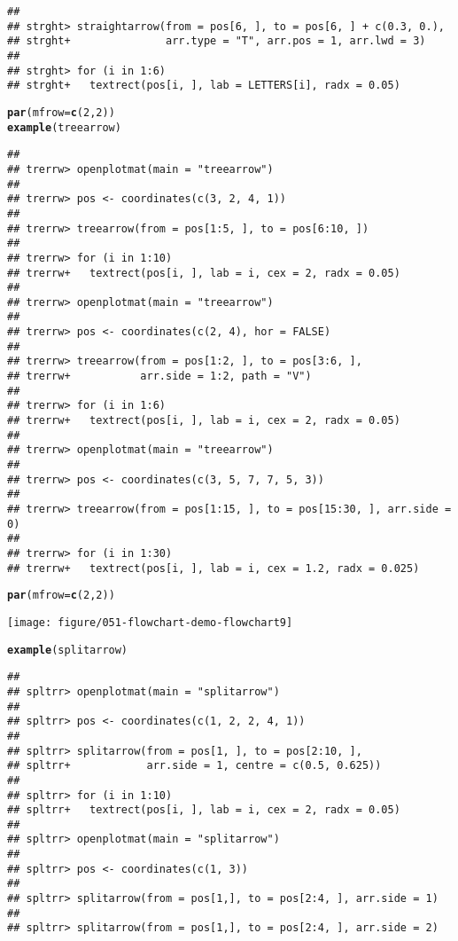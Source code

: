 \documentclass{article}\usepackage[]{graphicx}\usepackage[]{color}
\makeatletter
\def\maxwidth{ %
  \ifdim\Gin@nat@width>\linewidth
    \linewidth
  \else
    \Gin@nat@width
  \fi
}
\newcommand{\hlnum}[1]{\textcolor[rgb]{0.686,0.059,0.569}{#1}}%
\newcommand{\hlstd}[1]{\textcolor[rgb]{0.345,0.345,0.345}{#1}}%
\newcommand{\hlkwc}[1]{\textcolor[rgb]{0.333,0.667,0.333}{#1}}%
\newcommand{\hlkwd}[1]{\textcolor[rgb]{0.737,0.353,0.396}{\textbf{#1}}}%
\newenvironment{kframe}{%
 \def\at@end@of@kframe{}%
 \ifinner\ifhmode%
  \def\at@end@of@kframe{\end{minipage}}%
  \begin{minipage}{\columnwidth}%
 \fi\fi%
 \def\FrameCommand##1{\hskip\@totalleftmargin \hskip-\fboxsep
 \colorbox{shadecolor}{##1}\hskip-\fboxsep
     \hskip-\linewidth \hskip-\@totalleftmargin \hskip\columnwidth}%
 \MakeFramed {\advance\hsize-\width
   \@totalleftmargin\z@ \linewidth\hsize
   \@setminipage}}%
 {\par\unskip\endMakeFramed%
 \at@end@of@kframe}
\newenvironment{knitrout}{}{} %
\makeatother
\begin{document}
\begin{knitrout}
\begin{kframe}
\begin{verbatim}
## 
## strght> straightarrow(from = pos[6, ], to = pos[6, ] + c(0.3, 0.), 
## strght+               arr.type = "T", arr.pos = 1, arr.lwd = 3)    
## 
## strght> for (i in 1:6) 
## strght+   textrect(pos[i, ], lab = LETTERS[i], radx = 0.05)
\end{verbatim}
\begin{alltt}
\hlkwd{par}\hlstd{(}\hlkwc{mfrow} \hlstd{=} \hlkwd{c}\hlstd{(}\hlnum{2}\hlstd{,} \hlnum{2}\hlstd{))}
\hlkwd{example}\hlstd{(treearrow)}
\end{alltt}
\begin{verbatim}
## 
## trerrw> openplotmat(main = "treearrow")
## 
## trerrw> pos <- coordinates(c(3, 2, 4, 1))
## 
## trerrw> treearrow(from = pos[1:5, ], to = pos[6:10, ])
## 
## trerrw> for (i in 1:10) 
## trerrw+   textrect(pos[i, ], lab = i, cex = 2, radx = 0.05)
## 
## trerrw> openplotmat(main = "treearrow")
## 
## trerrw> pos <- coordinates(c(2, 4), hor = FALSE)
## 
## trerrw> treearrow(from = pos[1:2, ], to = pos[3:6, ], 
## trerrw+           arr.side = 1:2, path = "V")
## 
## trerrw> for (i in 1:6) 
## trerrw+   textrect(pos[i, ], lab = i, cex = 2, radx = 0.05)
## 
## trerrw> openplotmat(main = "treearrow")
## 
## trerrw> pos <- coordinates(c(3, 5, 7, 7, 5, 3))
## 
## trerrw> treearrow(from = pos[1:15, ], to = pos[15:30, ], arr.side = 0)
## 
## trerrw> for (i in 1:30) 
## trerrw+   textrect(pos[i, ], lab = i, cex = 1.2, radx = 0.025)
\end{verbatim}
\begin{alltt}
\hlkwd{par}\hlstd{(}\hlkwc{mfrow} \hlstd{=} \hlkwd{c}\hlstd{(}\hlnum{2}\hlstd{,} \hlnum{2}\hlstd{))}
\end{alltt}
\end{kframe}
\texttt{[image: figure/051-flowchart-demo-flowchart9]} 
\begin{kframe}\begin{alltt}
\hlkwd{example}\hlstd{(splitarrow)}
\end{alltt}
\begin{verbatim}
## 
## spltrr> openplotmat(main = "splitarrow")
## 
## spltrr> pos <- coordinates(c(1, 2, 2, 4, 1))
## 
## spltrr> splitarrow(from = pos[1, ], to = pos[2:10, ], 
## spltrr+            arr.side = 1, centre = c(0.5, 0.625))
## 
## spltrr> for (i in 1:10) 
## spltrr+   textrect(pos[i, ], lab = i, cex = 2, radx = 0.05)
## 
## spltrr> openplotmat(main = "splitarrow")
## 
## spltrr> pos <- coordinates(c(1, 3))
## 
## spltrr> splitarrow(from = pos[1,], to = pos[2:4, ], arr.side = 1)
## 
## spltrr> splitarrow(from = pos[1,], to = pos[2:4, ], arr.side = 2)

\end{verbatim}
\end{kframe}
\end{knitrout}
\end{document}
